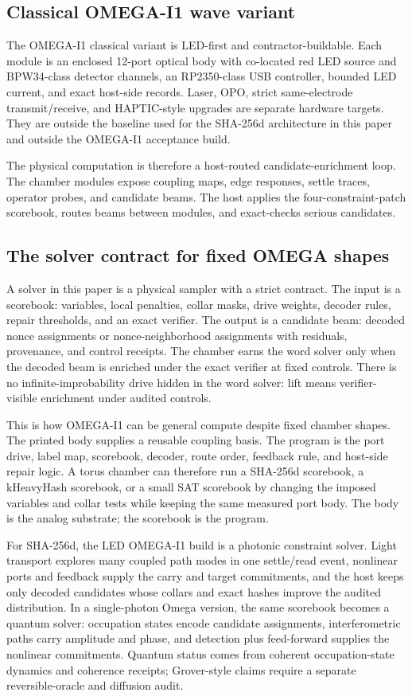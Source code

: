 \documentclass[11pt]{article}
\theoremstyle{definition}
\theoremstyle{remark}
\begin{document}
\subsection{Classical OMEGA-I1 wave variant}

The OMEGA-I1 classical variant is LED-first and contractor-buildable. Each
module is an enclosed 12-port optical body with co-located red LED source and
BPW34-class detector channels, an RP2350-class USB controller, bounded LED
current, and exact host-side records. Laser, OPO, strict same-electrode
transmit/receive, and HAPTIC-style upgrades are separate hardware targets. They
are outside the baseline used for the SHA-256d architecture in this paper
and outside the OMEGA-I1 acceptance build.

The physical computation is therefore a host-routed candidate-enrichment loop.
The chamber modules expose coupling maps, edge responses, settle traces,
operator probes, and candidate beams. The host applies the four-constraint-patch scorebook,
routes beams between modules, and exact-checks serious candidates.

\subsection{The solver contract for fixed OMEGA shapes}

A solver in this paper is a physical sampler with a strict contract. The input is
a scorebook: variables, local penalties, collar masks, drive weights, decoder
rules, repair thresholds, and an exact verifier. The output is a candidate beam:
decoded nonce assignments or nonce-neighborhood assignments with residuals,
provenance, and control receipts. The chamber earns the word solver only when
the decoded beam is enriched under the exact verifier at fixed controls.
There is no infinite-improbability drive hidden in the word solver: lift means
verifier-visible enrichment under audited controls.

This is how OMEGA-I1 can be general compute despite fixed chamber shapes. The
printed body supplies a reusable coupling basis. The program is the port drive,
label map, scorebook, decoder, route order, feedback rule, and host-side repair
logic. A torus chamber can therefore run a SHA-256d scorebook, a kHeavyHash
scorebook, or a small SAT scorebook by changing the imposed variables and collar
tests while keeping the same measured port body. The body is the analog
substrate; the scorebook is the program.

For SHA-256d, the LED OMEGA-I1 build is a photonic constraint solver. Light
transport explores many coupled path modes in one settle/read event, nonlinear
ports and feedback supply the carry and target commitments, and the host keeps
only decoded candidates whose collars and exact hashes improve the audited
distribution. In a single-photon Omega version, the same scorebook becomes a
quantum solver: occupation states encode candidate assignments, interferometric
paths carry amplitude and phase, and detection plus feed-forward supplies the
nonlinear commitments. Quantum status comes from coherent occupation-state
dynamics and coherence receipts; Grover-style claims require a separate
reversible-oracle and diffusion audit.
\end{document}
